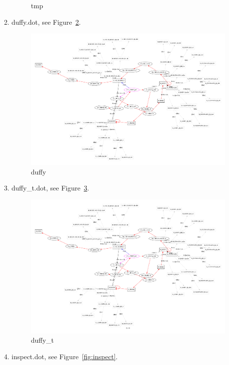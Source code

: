 \documentclass[12pt,a4paper]{report}
\begin{document}
\begin{enumerate}
\begin{figure}
        \caption{tmp}
        \label{fig:tmp}
    \end{figure}
\item duffy.dot, see Figure~\ref{fig:duffy}.
    \begin{figure}
        \centering
        \includegraphics*[width=1.0\textwidth,keepaspectratio]{TestPattern/duffy.pdf}
        \caption{duffy}
        \label{fig:duffy}
    \end{figure}
\item duffy\_t.dot, see Figure~\ref{fig:duffy_t}.
    \begin{figure}
        \centering
        \includegraphics*[width=1.0\textwidth,keepaspectratio]{TestPattern/duffy_t.pdf}
        \caption{duffy\_t}
        \label{fig:duffy_t}
    \end{figure}
\item inspect.dot, see Figure~\ref{fig:inspect}.

\end{enumerate}
\end{document}
